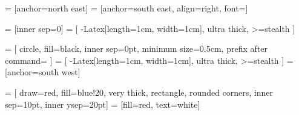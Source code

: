 
\usepackage{mwe}
\usepackage{blindtext}
\usepackage{relsize}
\usetikzlibrary{positioning	}
\usetikzlibrary{arrows.meta}
\usetikzlibrary{calc}


\newcommand{\macrocolor}{red}
\newcommand{\microcolor}{blue}
\newcommand{\macrotext}[1]{\color{\macrocolor}#1}
\newcommand{\microtext}[1]{\color{\microcolor}#1}
\newcommand{\black}[1]{\color{black}#1}

\newcommand{\FIGWIDTH}{17cm} %
\newcommand{\FIGHEIGHT}{12cm} %
\newcommand{\VERTFIGSEP}{2cm} %
\newcommand{\HORFIGSEP}{4cm} %
 = [anchor=north east]
 = [anchor=south east, align=right, font=\footnotesize]

 = [inner sep=0]
 = [
		-{Latex[length=1cm, width=1cm]},
		ultra thick,
		>=stealth
]

 = [
		circle,
		fill=black,
		inner sep=0pt,
		minimum size=0.5cm,
		prefix after command= {}
]
 = [
		-{Latex[length=1cm, width=1cm]},
		ultra thick,
		>=stealth
]
 = [anchor=south west]
\newcommand{\PPWIDTH}{2cm}
\newcommand{\PPHEIGHT}{2cm}

 = [
		draw=red,
		fill=blue!20,
		very thick,
    rectangle,
		rounded corners,
		inner sep=10pt,
		inner ysep=20pt]
 = [fill=red, text=white]

\newcommand{\xo}{\bigotimes}
\newcommand{\includedimensions}[1]{}
